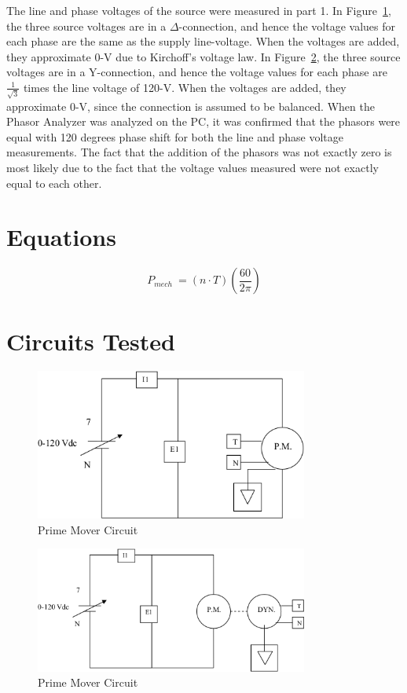 \documentclass{article}
\begin{document}
%
The line and phase voltages of the source were measured in part 1. In
Figure~\ref{fig:circuit_01}, the three source voltages are in a
$\Delta$-connection, and hence the voltage values for each phase are the same
as the supply line-voltage.  When the voltages are added, they approximate 0-V
due to Kirchoff's voltage law. In Figure~\ref{fig:circuit_02}, the three source
voltages are in a Y-connection, and hence the voltage values for each phase are
$\frac{1}{\sqrt{3}}$ times the line voltage of 120-V.  When the voltages are
added, they approximate 0-V, since the connection is assumed to be balanced.
When the Phasor Analyzer was analyzed on the {PC}, it was confirmed that the
phasors were equal with 120 degrees phase shift for both the line and phase
voltage measurements. The fact that the addition of the phasors was not exactly
zero is most likely due to the fact that the voltage values measured were not
exactly equal to each other.

\section*{Equations}

\[P_{mech}\ =  (n \cdot T)\left(\frac{60}{2\pi}\right) \]

\section*{Circuits Tested}

\begin{figure}[H]
  \centering
  \includegraphics[width=0.8\textwidth]{img/circuit_01}
  \caption{Prime Mover Circuit}
  \label{fig:circuit_01}
\end{figure}

\begin{figure}[H]
  \centering
  \includegraphics[width=0.8\textwidth]{img/circuit_02}
  \caption{Prime Mover Circuit}
  \label{fig:circuit_02}
\end{figure}
\end{document}
